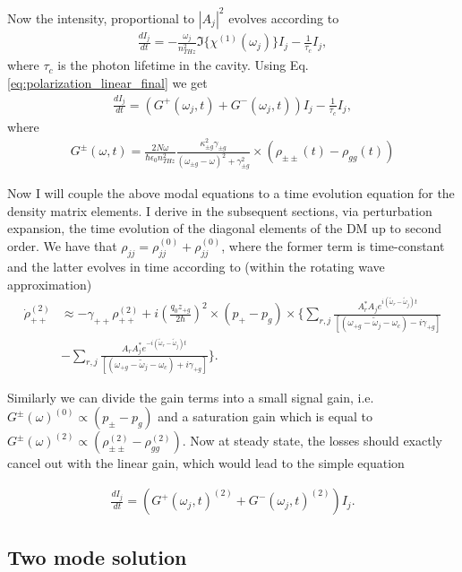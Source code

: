\documentclass[preprint,secnumarabic,amssymb, nobibnotes, aip, prd]{revtex4-1}
\def\tw{\tilde{\omega}}
\def\tw{\tilde{\omega}}
\begin{document}
	Now the intensity, proportional to $|A_j|^2$ evolves according to
	\begin{align}
	\frac{dI_j}{dt} = -\frac{\omega_j }{n_{THz}^2} \Im\{\chi^{(1)}(\omega_j)\} I_j -\frac{1}{\tau_c} I_j,
	\end{align}
	where $\tau_c$ is the photon lifetime in the cavity. Using Eq. \ref{eq:polarization_linear_final} we get 
	\begin{align}
	\frac{dI_j}{dt} = (G^{+}(\omega_j,t)+G^{-}(\omega_j,t))I_j -\frac{1}{\tau_c} I_j,
	\end{align}
	where 
	\begin{align}
		G^{\pm}(\omega,t) = \frac{2N\omega}{\hbar\epsilon_0 n_{THz}^2}\frac{\kappa_{\pm g}^2\gamma_{\pm g}}{(\omega_{\pm g}-\omega)^2+\gamma_{\pm g}^2}\times(\rho_{\pm\pm}(t)-\rho_{gg}(t))
	\end{align}
		
	Now I will couple the above modal equations to a time evolution equation for the density matrix elements. I derive in the subsequent sections, via perturbation expansion, the time evolution of the diagonal elements of the DM up to second order. We have that $\rho_{jj} = \rho_{jj}^{(0)}+\rho_{jj}^{(0)}$, where the former term is time-constant and the latter evolves in time according to (within the rotating wave approximation)
	\begin{align}
	\dot{\rho}_{++}^{(2)} &\approx -\gamma_{++}\rho_{++}^{(2)} + i\left(\frac{q_0z_{+g}}{2\hbar}\right)^2\times (p_+-p_g) \times 
	\Big \{
	\sum_{r,j} \frac{A_r^*A_je^{i(\tw_r-\tw_j)t}}{[( \omega_{+ g} - \tw_j-\omega_c) -i\gamma_{+ g}]} \nonumber \\
	&- \sum_{r,j} \frac{A_rA_j^*e^{-i(\tw_r-\tw_j)t}}{[( \omega_{+ g} - \tw_j-\omega_c) +i\gamma_{+ g}]}
	\Big \}.
	\end{align}
	
	Similarly we can divide the gain terms into a small signal gain, i.e. $G^{\pm}(\omega)^{(0)}\propto (p_\pm-p_g)$ and a saturation gain which is equal to $G^{\pm}(\omega)^{(2)}\propto (\rho_{\pm\pm}^{(2)}-\rho_{gg}^{(2)})$. Now at steady state, the losses should exactly cancel out with the linear gain, which would lead to the simple equation 
	
	\begin{align}
	\frac{dI_j}{dt} = (G^{+}(\omega_j,t)^{(2)}+G^{-}(\omega_j,t)^{(2)})I_j.
	\end{align}
	\subsection{Two mode solution}
	
\end{document}
